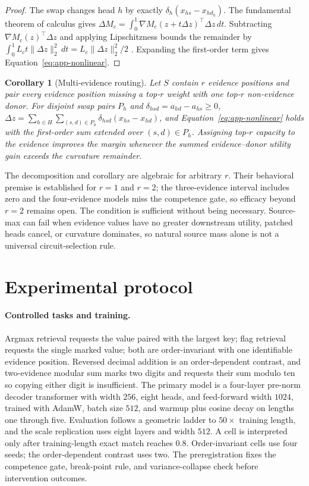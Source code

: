 \documentclass{article}
\newtheorem{corollary}[theorem]{Corollary}
\begin{document}
\begin{proof}
The swap changes head $h$ by exactly $\delta_h(x_{hs}-x_{hd_h})$. The fundamental theorem of calculus gives
$\Delta M_c=\int_0^1\nabla M_c(z+t\Delta z)^\top\Delta z\,dt$. Subtracting $\nabla M_c(z)^\top\Delta z$ and
applying Lipschitzness bounds the remainder by $\int_0^1 L_c t\lVert\Delta z\rVert_2^2\,dt=L_c\lVert\Delta z
\rVert_2^2/2$ \citep{nesterov2004}. Expanding the first-order term gives Equation~\ref{eq:app-nonlinear}.
\end{proof}

\begin{corollary}[Multi-evidence routing]
Let $S$ contain $r$ evidence positions and pair every evidence position missing a top-$r$ weight with one
top-$r$ non-evidence donor. For disjoint swap pairs $P_h$ and $\delta_{hsd}=a_{hd}-a_{hs}\ge0$,
$\Delta z=\sum_{h\in H}\sum_{(s,d)\in P_h}\delta_{hsd}(x_{hs}-x_{hd})$, and Equation~\ref{eq:app-nonlinear}
holds with the first-order sum extended over $(s,d)\in P_h$. Assigning top-$r$ capacity to the evidence
improves the margin whenever the summed evidence--donor utility gain exceeds the curvature remainder.
\label{cor:multi}
\end{corollary}

The decomposition and corollary are algebraic for arbitrary $r$. Their behavioral premise is established for
$r=1$ and $r=2$; the three-evidence interval includes zero and the four-evidence models miss the competence
gate, so efficacy beyond $r=2$ remains open. The condition is sufficient without being necessary. Source-max
can fail when evidence values have no greater downstream utility, patched heads cancel, or curvature dominates,
so natural source mass alone is not a universal circuit-selection rule.

\section{Experimental protocol}
\label{app:protocol}

\paragraph{Controlled tasks and training.}
Argmax retrieval requests the value paired with the largest key; flag retrieval requests the single marked
value; both are order-invariant with one identifiable evidence position. Reversed decimal addition is an
order-dependent contrast, and two-evidence modular sum marks two digits and requests their sum modulo ten so
copying either digit is insufficient. The primary model is a four-layer pre-norm decoder transformer with
width $256$, eight heads, and feed-forward width $1024$, trained with AdamW, batch size $512$, and warmup plus
cosine decay on lengths one through five. Evaluation follows a geometric ladder to $50\times$ training length,
and the scale replication uses eight layers and width $512$. A cell is interpreted only after training-length
exact match reaches $0.8$. Order-invariant cells use four seeds; the order-dependent contrast uses two. The
preregistration fixes the competence gate, break-point rule, and variance-collapse check before intervention
outcomes.
\end{document}
